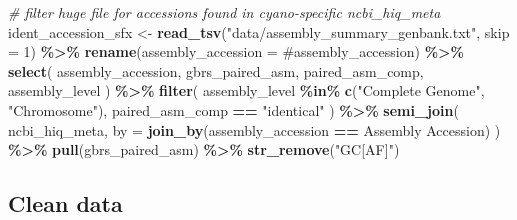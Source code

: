 \documentclass[
]{article}
\newenvironment{Shaded}{\begin{snugshade}}{\end{snugshade}}
\newcommand{\AttributeTok}[1]{\textcolor[rgb]{0.13,0.29,0.53}{#1}}
\newcommand{\CommentTok}[1]{\textcolor[rgb]{0.56,0.35,0.01}{\textit{#1}}}
\newcommand{\DecValTok}[1]{\textcolor[rgb]{0.00,0.00,0.81}{#1}}
\newcommand{\FunctionTok}[1]{\textcolor[rgb]{0.13,0.29,0.53}{\textbf{#1}}}
\newcommand{\NormalTok}[1]{#1}
\newcommand{\OtherTok}[1]{\textcolor[rgb]{0.56,0.35,0.01}{#1}}
\newcommand{\SpecialCharTok}[1]{\textcolor[rgb]{0.81,0.36,0.00}{\textbf{#1}}}
\newcommand{\StringTok}[1]{\textcolor[rgb]{0.31,0.60,0.02}{#1}}
\begin{document}
\begin{Shaded}
\begin{Highlighting}[]
\CommentTok{\# filter huge file for accessions found in cyano{-}specific \textasciigrave{}ncbi\_hiq\_meta\textasciigrave{}}
\NormalTok{ident\_accession\_sfx }\OtherTok{\textless{}{-}} \FunctionTok{read\_tsv}\NormalTok{(}\StringTok{"data/assembly\_summary\_genbank.txt"}\NormalTok{, }\AttributeTok{skip =} \DecValTok{1}\NormalTok{) }\SpecialCharTok{\%\textgreater{}\%}
  \FunctionTok{rename}\NormalTok{(}\AttributeTok{assembly\_accession =} \StringTok{\textasciigrave{}}\AttributeTok{\#assembly\_accession}\StringTok{\textasciigrave{}}\NormalTok{) }\SpecialCharTok{\%\textgreater{}\%}
  \FunctionTok{select}\NormalTok{(}
\NormalTok{    assembly\_accession,}
\NormalTok{    gbrs\_paired\_asm,}
\NormalTok{    paired\_asm\_comp,}
\NormalTok{    assembly\_level}
\NormalTok{  ) }\SpecialCharTok{\%\textgreater{}\%}
  \FunctionTok{filter}\NormalTok{(}
\NormalTok{    assembly\_level }\SpecialCharTok{\%in\%} \FunctionTok{c}\NormalTok{(}\StringTok{"Complete Genome"}\NormalTok{, }\StringTok{"Chromosome"}\NormalTok{),}
\NormalTok{    paired\_asm\_comp }\SpecialCharTok{==} \StringTok{"identical"}
\NormalTok{  ) }\SpecialCharTok{\%\textgreater{}\%}
  \FunctionTok{semi\_join}\NormalTok{(}
\NormalTok{    ncbi\_hiq\_meta,}
    \AttributeTok{by =} \FunctionTok{join\_by}\NormalTok{(assembly\_accession }\SpecialCharTok{==} \StringTok{\textasciigrave{}}\AttributeTok{Assembly Accession}\StringTok{\textasciigrave{}}\NormalTok{)}
\NormalTok{  ) }\SpecialCharTok{\%\textgreater{}\%} 
  \FunctionTok{pull}\NormalTok{(gbrs\_paired\_asm) }\SpecialCharTok{\%\textgreater{}\%} 
  \FunctionTok{str\_remove}\NormalTok{(}\StringTok{"GC[AF]"}\NormalTok{)}
\end{Highlighting}
\end{Shaded}

\subsection{Clean data}\label{clean-data}
\end{document}
